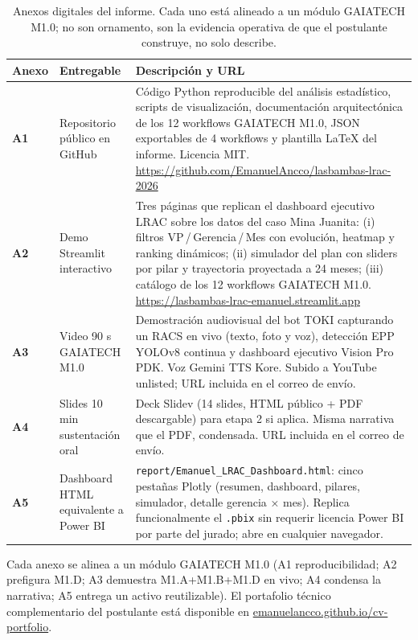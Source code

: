 \documentclass[12pt,a4paper]{article}
\renewcommand{\arraystretch}{1.20}
\begin{document}
\begin{table}[h]
\centering\footnotesize
\setlength{\tabcolsep}{4pt}
\renewcommand{\arraystretch}{1.15}
\begin{tabularx}{\linewidth}{@{}p{0.8cm} >{\raggedright\arraybackslash}p{3.4cm} X@{}}
\toprule
\textbf{Anexo} & \textbf{Entregable} & \textbf{Descripción y URL} \\
\midrule
\textbf{A1} & Repositorio público en GitHub & Código Python reproducible del análisis estadístico, scripts de visualización, documentación arquitectónica de los 12 workflows GAIATECH M1.0, JSON exportables de 4 workflows y plantilla LaTeX del informe. Licencia MIT. \newline \url{https://github.com/EmanuelAncco/lasbambas-lrac-2026} \\
\textbf{A2} & Demo Streamlit interactivo & Tres páginas que replican el dashboard ejecutivo LRAC sobre los datos del caso Mina Juanita: (i) filtros VP\,/\,Gerencia\,/\,Mes con evolución, heatmap y ranking dinámicos; (ii) simulador del plan con sliders por pilar y trayectoria proyectada a 24 meses; (iii) catálogo de los 12 workflows GAIATECH M1.0. \newline \url{https://lasbambas-lrac-emanuel.streamlit.app} \\
\textbf{A3} & Video 90 s GAIATECH M1.0 & Demostración audiovisual del bot TOKI capturando un RACS en vivo (texto, foto y voz), detección EPP YOLOv8 continua y dashboard ejecutivo Vision Pro PDK. Voz Gemini TTS Kore. Subido a YouTube unlisted; URL incluida en el correo de envío. \\
\textbf{A4} & Slides 10 min sustentación oral & Deck Slidev (14 slides, HTML público + PDF descargable) para etapa 2 si aplica. Misma narrativa que el PDF, condensada. URL incluida en el correo de envío. \\
\textbf{A5} & Dashboard HTML equivalente a Power BI & \texttt{report/Emanuel\_LRAC\_Dashboard.html}: cinco pestañas Plotly (resumen, dashboard, pilares, simulador, detalle gerencia × mes). Replica funcionalmente el \texttt{.pbix} sin requerir licencia Power BI por parte del jurado; abre en cualquier navegador. \\
\bottomrule
\end{tabularx}
\caption{Anexos digitales del informe. Cada uno está alineado a un módulo GAIATECH M1.0; no son ornamento, son la evidencia operativa de que el postulante construye, no solo describe.}
\label{tab:anexos}
\end{table}

Cada anexo se alinea a un módulo GAIATECH M1.0 (A1 reproducibilidad; A2 prefigura M1.D; A3 demuestra M1.A+M1.B+M1.D en vivo; A4 condensa la narrativa; A5 entrega un activo reutilizable). El portafolio técnico complementario del postulante está disponible en \href{https://emanuelancco.github.io/cv-portfolio/}{emanuelancco.github.io/cv-portfolio}.
\end{document}
